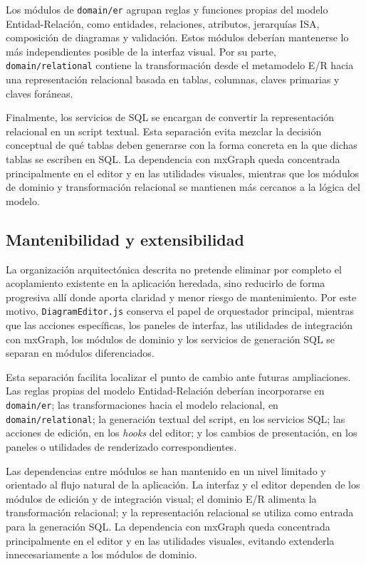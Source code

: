 Los módulos de \texttt{domain/er} agrupan reglas y funciones propias del modelo Entidad-Relación, como entidades, relaciones, atributos, jerarquías ISA, composición de diagramas y validación. Estos módulos deberían mantenerse lo más independientes posible de la interfaz visual. Por su parte, \texttt{domain/relational} contiene la transformación desde el metamodelo E/R hacia una representación relacional basada en tablas, columnas, claves primarias y claves foráneas.

Finalmente, los servicios de SQL se encargan de convertir la representación relacional en un script textual. Esta separación evita mezclar la decisión conceptual de qué tablas deben generarse con la forma concreta en la que dichas tablas se escriben en SQL. La dependencia con mxGraph queda concentrada principalmente en el editor y en las utilidades visuales, mientras que los módulos de dominio y transformación relacional se mantienen más cercanos a la lógica del modelo.

\subsection{Mantenibilidad y extensibilidad}

La organización arquitectónica descrita no pretende eliminar por completo el acoplamiento existente en la aplicación heredada, sino reducirlo de forma progresiva allí donde aporta claridad y menor riesgo de mantenimiento. Por este motivo, \texttt{DiagramEditor.js} conserva el papel de orquestador principal, mientras que las acciones específicas, los paneles de interfaz, las utilidades de integración con mxGraph, los módulos de dominio y los servicios de generación SQL se separan en módulos diferenciados.

Esta separación facilita localizar el punto de cambio ante futuras ampliaciones. Las reglas propias del modelo Entidad-Relación deberían incorporarse en \texttt{domain/er}; las transformaciones hacia el modelo relacional, en \texttt{domain/relational}; la generación textual del script, en los servicios SQL; las acciones de edición, en los \textit{hooks} del editor; y los cambios de presentación, en los paneles o utilidades de renderizado correspondientes.

Las dependencias entre módulos se han mantenido en un nivel limitado y orientado al flujo natural de la aplicación. La interfaz y el editor dependen de los módulos de edición y de integración visual; el dominio E/R alimenta la transformación relacional; y la representación relacional se utiliza como entrada para la generación SQL. La dependencia con mxGraph queda concentrada principalmente en el editor y en las utilidades visuales, evitando extenderla innecesariamente a los módulos de dominio.

